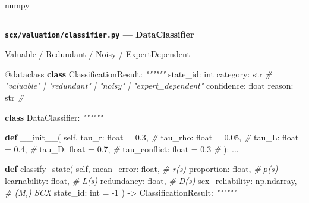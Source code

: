 \documentclass[
  12pt,
]{article}
\newenvironment{Shaded}{}{}
\newcommand{\AttributeTok}[1]{\textcolor[rgb]{0.49,0.56,0.16}{#1}}
\newcommand{\BuiltInTok}[1]{\textcolor[rgb]{0.00,0.50,0.00}{#1}}
\newcommand{\CommentTok}[1]{\textcolor[rgb]{0.38,0.63,0.69}{\textit{#1}}}
\newcommand{\DecValTok}[1]{\textcolor[rgb]{0.25,0.63,0.44}{#1}}
\newcommand{\FloatTok}[1]{\textcolor[rgb]{0.25,0.63,0.44}{#1}}
\newcommand{\FunctionTok}[1]{\textcolor[rgb]{0.02,0.16,0.49}{#1}}
\newcommand{\KeywordTok}[1]{\textcolor[rgb]{0.00,0.44,0.13}{\textbf{#1}}}
\newcommand{\NormalTok}[1]{#1}
\newcommand{\OperatorTok}[1]{\textcolor[rgb]{0.40,0.40,0.40}{#1}}
\newcommand{\VariableTok}[1]{\textcolor[rgb]{0.10,0.09,0.49}{#1}}
\begin{document}
numpy

\begin{center}\rule{0.5\linewidth}{0.5pt}\end{center}

\textbf{\texttt{scx/valuation/classifier.py} --- DataClassifier}

 Valuable / Redundant / Noisy /
ExpertDependent

\begin{Shaded}
\begin{Highlighting}[]
\AttributeTok{@dataclass}
\KeywordTok{class}\NormalTok{ ClassificationResult:}
    \CommentTok{""""""}
\NormalTok{    state\_id: }\BuiltInTok{int}
\NormalTok{    category: }\BuiltInTok{str}                    \CommentTok{\# "valuable" | "redundant" | "noisy" | "expert\_dependent"}
\NormalTok{    confidence: }\BuiltInTok{float}
\NormalTok{    reason: }\BuiltInTok{str}                      \CommentTok{\# }

\KeywordTok{class}\NormalTok{ DataClassifier:}
    \CommentTok{""""""}

    \KeywordTok{def} \FunctionTok{\_\_init\_\_}\NormalTok{(}
        \VariableTok{self}\NormalTok{,}
\NormalTok{        tau\_r: }\BuiltInTok{float} \OperatorTok{=} \FloatTok{0.3}\NormalTok{,          }\CommentTok{\# }
\NormalTok{        tau\_rho: }\BuiltInTok{float} \OperatorTok{=} \FloatTok{0.05}\NormalTok{,       }\CommentTok{\# }
\NormalTok{        tau\_L: }\BuiltInTok{float} \OperatorTok{=} \FloatTok{0.4}\NormalTok{,          }\CommentTok{\# }
\NormalTok{        tau\_D: }\BuiltInTok{float} \OperatorTok{=} \FloatTok{0.7}\NormalTok{,          }\CommentTok{\# }
\NormalTok{        tau\_conflict: }\BuiltInTok{float} \OperatorTok{=} \FloatTok{0.3}    \CommentTok{\# }
\NormalTok{    ):}
\NormalTok{        ...}

    \KeywordTok{def}\NormalTok{ classify\_state(}
        \VariableTok{self}\NormalTok{,}
\NormalTok{        mean\_error: }\BuiltInTok{float}\NormalTok{,           }\CommentTok{\# r̄(s)}
\NormalTok{        proportion: }\BuiltInTok{float}\NormalTok{,           }\CommentTok{\# ρ(s)}
\NormalTok{        learnability: }\BuiltInTok{float}\NormalTok{,         }\CommentTok{\# L(s)}
\NormalTok{        redundancy: }\BuiltInTok{float}\NormalTok{,           }\CommentTok{\# D(s)}
\NormalTok{        scx\_reliability: np.ndarray, }\CommentTok{\# (M,)  SCX}
\NormalTok{        state\_id: }\BuiltInTok{int} \OperatorTok{=} \OperatorTok{{-}}\DecValTok{1}
\NormalTok{    ) }\OperatorTok{{-}\textgreater{}}\NormalTok{ ClassificationResult:}
        \CommentTok{""""""}


\end{Highlighting}
\end{Shaded}
\end{document}
